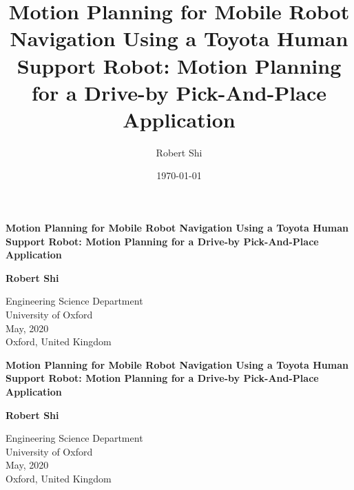 \documentclass[11pt]{article}
\title{Motion Planning for Mobile Robot Navigation Using a Toyota Human Support Robot: Motion Planning for a Drive-by Pick-And-Place Application}
\author{Robert Shi}
\date{\today}
\begin{document}
\begin{titlepage}
    \centering
    \vspace*{1cm}
    \LARGE
    \textbf{Motion Planning for Mobile Robot Navigation Using a Toyota Human Support Robot: Motion Planning for a Drive-by Pick-And-Place Application}


    \vspace{2.5cm}
    \textbf{Robert Shi}

    \vfill
        \Large
        Engineering Science Department\\
        University of Oxford\\
        May, 2020\\
        Oxford, United Kingdom\\
        \vspace{2.0cm}
\end{titlepage}
\begin{titlepage}
    \centering
    \vspace*{1cm}
    \LARGE
    \textbf{Motion Planning for Mobile Robot Navigation Using a Toyota Human Support Robot: Motion Planning for a Drive-by Pick-And-Place Application}
    
    
    \vspace{2.5cm}
    \textbf{Robert Shi}

    \vfill
        \Large
        Engineering Science Department\\
        University of Oxford\\
        May, 2020\\
        Oxford, United Kingdom\\
        \vspace{2.0cm}
\end{titlepage}

\newpage
\end{document}
